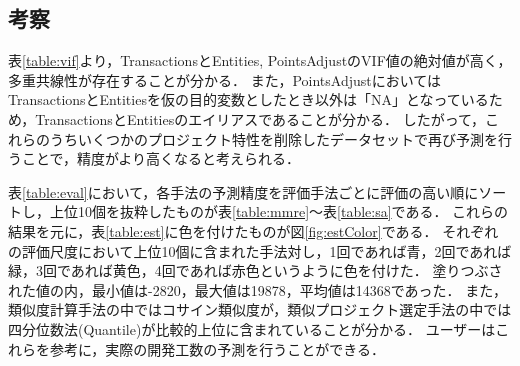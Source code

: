 \clearpage
\subsection{考察}

表\ref{table:vif}より，TransactionsとEntities, PointsAdjustのVIF値の絶対値が高く，多重共線性が存在することが分かる．
また，PointsAdjustにおいてはTransactionsとEntitiesを仮の目的変数としたとき以外は「NA」となっているため，TransactionsとEntitiesのエイリアスであることが分かる．
したがって，これらのうちいくつかのプロジェクト特性を削除したデータセットで再び予測を行うことで，精度がより高くなると考えられる．

表\ref{table:eval}において，各手法の予測精度を評価手法ごとに評価の高い順にソートし，上位10個を抜粋したものが表\ref{table:mmre}～表\ref{table:sa}である．
これらの結果を元に，表\ref{table:est}に色を付けたものが図\ref{fig:estColor}である．
それぞれの評価尺度において上位10個に含まれた手法対し，1回であれば青，2回であれば緑，3回であれば黄色，4回であれば赤色というように色を付けた．
塗りつぶされた値の内，最小値は-2820，最大値は19878，平均値は14368であった．
また，類似度計算手法の中ではコサイン類似度が，類似プロジェクト選定手法の中では四分位数法(Quantile)が比較的上位に含まれていることが分かる．
ユーザーはこれらを参考に，実際の開発工数の予測を行うことができる．

